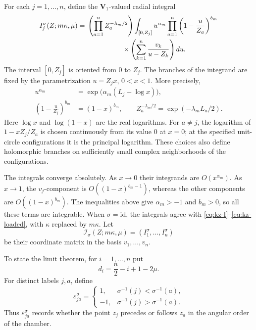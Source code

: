 \documentclass[12pt]{amsart}
\theoremstyle{definition}
\numberwithin{equation}{section}
\theoremstyle{definition}
\let\mc\mathcal
\let\eps\varepsilon
\let\ka\kappa
\let\si\sigma
\def\beq{\begin{equation}}
\def\eeq{\end{equation}}
\begin{document}
For each $j=1,\ldots,n$, define the $\mathbf V_1$-valued radial integral
\beq\label{eq:hyp-limit-radials-sigma}
 \begin{aligned}
 I_j^\si(Z;m\ka,\mu)
 ={}&\left(\prod_{a=1}^n Z_a^{-\lambda_m/2}\right)
 \int_{[0,Z_j]}u^{\alpha_m}
 \prod_{a=1}^n\left(1-\frac{u}{Z_a}\right)^{b_m}\\
 &\hspace{18mm}\times
 \left(\sum_{k=1}^n\frac{v_k}{u-Z_k}\right)du.
 \end{aligned}
\eeq
The interval $[0,Z_j]$ is oriented from $0$ to $Z_j$.
The branches of the integrand are fixed by the parametrization
$u=Z_jx$, $0<x<1$.  More precisely,
\beq\label{eq:hyp-limit-loadings-sigma}
 \begin{aligned}
 u^{\alpha_m}&=\exp\bigl(\alpha_m(L_j+\log x)\bigr),\\
 \left(1-\frac{u}{Z_j}\right)^{b_m}&=(1-x)^{b_m},\qquad
 Z_a^{-\lambda_m/2}=\exp(-\lambda_m L_a/2).
 \end{aligned}
\eeq
Here $\log x$ and $\log(1-x)$ are the real logarithms.  For
$a\ne j$, the logarithm of $1-xZ_j/Z_a$ is chosen continuously
from its value $0$ at $x=0$; at the specified unit-circle
configurations it is the principal logarithm.  These choices
also define holomorphic branches on sufficiently small
complex neighborhoods of the configurations.

The integrals converge absolutely.  As $x\to0$ their
integrands are $O(x^{\alpha_m})$.  As $x\to1$, the $v_j$-component
is $O((1-x)^{b_m-1})$, whereas the other components are
$O((1-x)^{b_m})$.  The inequalities above give
$\alpha_m>-1$ and $b_m>0$, so all these terms are integrable.
When $\si=\mathrm{id}$, the integrals agree with
\eqref{eq:kz-I}--\eqref{eq:kz-loaded}, with $\ka$ replaced by
$m\ka$.  Let
\[
 \mc I_\si(Z;m\ka,\mu)=(I_1^\si,\ldots,I_n^\si)
\]
be their coordinate matrix in the basis $v_1,\ldots,v_n$.

To state the limit theorem, for $i=1,\ldots,n$ put
\beq\label{eq:hyp-limit-di}
 d_i=\frac n2-i+1-2\mu.
\eeq
For distinct labels $j,a$, define
\beq\label{eq:hyp-limit-order-signs}
 \eps_{ja}^\si=
 \begin{cases}
  1,&\si^{-1}(j)<\si^{-1}(a),\\
 -1,&\si^{-1}(j)>\si^{-1}(a).
 \end{cases}
\eeq
Thus $\eps_{ja}^\si$ records whether the point $z_j$ precedes
or follows $z_a$ in the angular order of the chamber.
\end{document}
